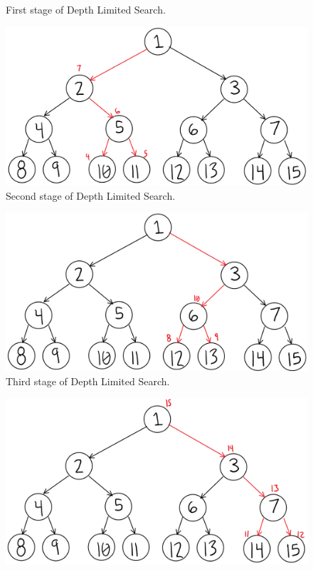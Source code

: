 \documentclass[11pt]{article}
\newenvironment{problem}[2][Problem]{\begin{trivlist}
\item[\hskip \labelsep {\bfseries #1}\hskip \labelsep {\bfseries #2.}]}{\end{trivlist}}
\begin{document}
\begin{problem}{10}
\begin{enumerate}
\begin{figure}
				\caption{First stage of Depth Limited Search.}
				\label{fig.bfs}
			\end{figure}
			\begin{figure}
				\includegraphics[scale=0.5]{DLS_2.png}
				\caption{Second stage of Depth Limited Search.}
				\label{fig.bfs}
			\end{figure}
			\begin{figure}
				\includegraphics[scale=0.5]{DLS_3.PNG}
				\caption{Third stage of Depth Limited Search.}
				\label{fig.bfs}
			\end{figure}
			\begin{figure}
				\includegraphics[scale=0.5]{DLS_4.PNG}

\end{figure}
\end{enumerate}
\end{problem}
\end{document}

